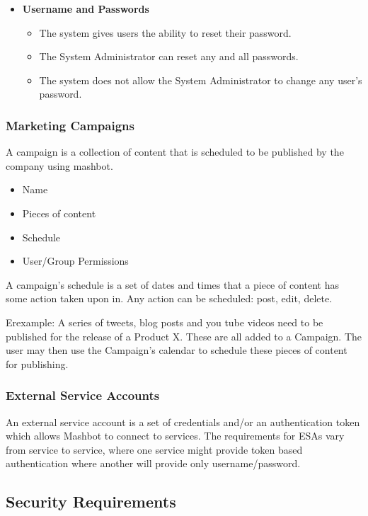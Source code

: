 \documentclass{report}
\begin{document}
\begin{itemize}
				\item \textbf{Username and Passwords}
					\begin{itemize}
						\item The system gives users the ability to reset their 
						password.
						\item The System Administrator can reset any and all 
						passwords.
						\item The system does not allow the System Administrator 
						to change any user's password.
					\end{itemize}
			\end{itemize}

		\subsubsection{Marketing Campaigns} %
				A campaign is a collection of content that is scheduled to be 
				published by the company using mashbot.
                \begin{itemize}
                  \item Name
                  \item Pieces of content
                  \item Schedule
                  \item User/Group Permissions
                \end{itemize}
				A campaign's schedule is a set of dates and times that a piece 
				of content has some action taken upon in.  Any action can be 
				scheduled: post, edit, delete.
                
				Erexample: A series of tweets, blog posts and you tube videos 
		need to be published for the release of a Product X.  These are all 
		added to a Campaign.  The user may then use the Campaign's calendar to 
		schedule these pieces of content for publishing.
		\subsubsection{External Service Accounts} %
                An external service account is a set of credentials and/or an 
				authentication token which allows Mashbot to connect to 
				services.  The requirements for ESAs vary from service to 
				service, where one service might provide token based 
				authentication where another will provide only 
				username/password.
	\subsection{Security Requirements} %
\end{document}
